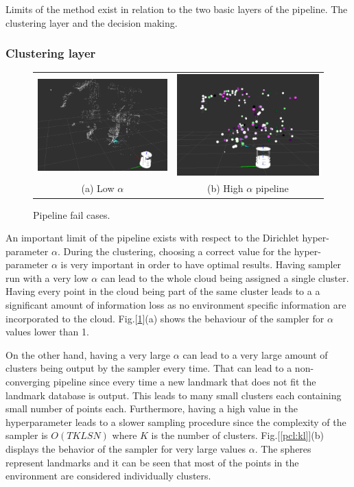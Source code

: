 \documentclass[]{article}
\begin{document}
    Limits of the method exist in relation to the two basic layers of the pipeline. The clustering layer and the decision making.

    \subsubsection{Clustering layer}
    \begin{figure}
        \begin{tabular}{cc}
            \includegraphics[width=.26\textwidth]{singlecluster} &  \includegraphics[width=.26\textwidth]{onlyclusters2} \\
            (a) Low $\alpha$ & (b) High $\alpha$ pipeline\\
        \end{tabular}
        \caption{Pipeline fail cases.}
        \label{pip:limits}
    \end{figure}

    An important limit of the pipeline exists with respect to the Dirichlet hyper-parameter $\alpha$. During the clustering, choosing a correct value for the hyper-parameter $\alpha$ is very important in order to have optimal results. Having sampler run with a very low $\alpha$ can lead to the whole cloud being assigned a single cluster. Having every point in the cloud being part of the same cluster leads to a a significant amount of information loss as no environment specific information are incorporated to the cloud. Fig.[\ref{pip:limits}](a) shows the behaviour of the sampler for $\alpha$ values lower than 1. 



    On the other hand, having a very large $\alpha$ can lead to a very large amount of clusters being output by the sampler every time. That can lead to a non-converging pipeline since every time a new landmark that does not fit the landmark database is output. This leads to many small clusters each containing small number of points each. Furthermore, having a high value in the hyperparameter leads to a slower sampling procedure since the complexity of the sampler is $O(TKLSN)$ where $K$ is the number of clusters. Fig.[\ref{pcl:kl}](b) displays the behavior of the sampler for very large values $\alpha$. The spheres represent landmarks and it can be seen that most of the points in the environment are considered individually clusters.
\end{document}
